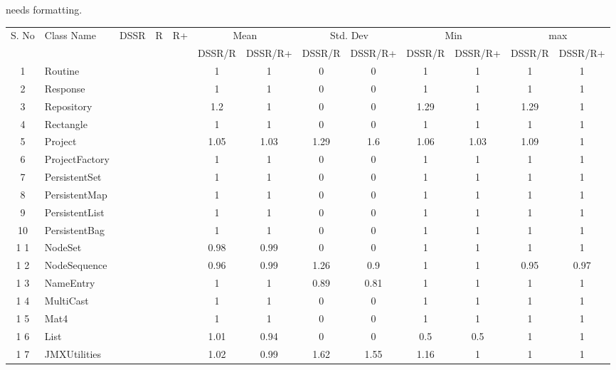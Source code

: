 \documentclass[conference]{IEEEtran}
\begin{document}
\newpage
needs formatting.
\newpage
 \scriptsize
    \begin{tabular}{|c|l|c|c|c|c|c|c|c|c|c|c|c|}
      \hline
      \multirow{2}{*}{S. No}	&\multirow{2}{*}{Class Name}	&\multirow{2}{*}{DSSR}	&	\multirow{2}{*}{R}	&	\multirow{2}{*}{R+}	& \multicolumn{2}{|c|}{Mean}	&\multicolumn{2}{|c|}{Std. Dev} & \multicolumn{2}{|c|}{Min} & \multicolumn{2}{|c|}{max}\\
      \cline{6-13}
             	& 			&&&		& DSSR/R		& DSSR/R+		& DSSR/R		& DSSR/R+		& DSSR/R		& DSSR/R+		& DSSR/R	 &	DSSR/R+	\\
	 \hline
      
      1		& Routine				&&&& 1		& 1		&  0		& 0		& 1		& 1		& 1		& 1	\\
      2		& Response			&&&& 1		& 1		&  0		& 0		& 1		& 1		& 1		& 1	\\
      3		& Repository			&&&& 1.2	& 1		&  0		& 0		& 1.29	& 1		& 1.29	& 1	\\
      4		& Rectangle			&&&& 1		& 1		&  0		& 0		& 1		& 1		& 1		& 1	\\
      5		& Project				&&&& 1.05	& 1.03	&  1.29	& 1.6	& 1.06	& 1.03	& 1.09	& 1	\\
      6		& ProjectFactory		&&&& 1		& 1		& 0		& 0		& 1		& 1		& 1		& 1	\\
      7		& PersistentSet			&&&& 1		& 1		& 0		& 0		& 1		& 1		& 1		& 1	\\
      8		& PersistentMap	&&&	& 1		& 1		& 0		& 0		& 1		& 1		& 1		& 1	\\
      9		& PersistentList		&&&	& 1		& 1		& 0		& 0		& 1		& 1		& 1		& 1	\\
      10	& PersistentBag	&&&	& 1		& 1		& 0		& 0		& 1		& 1		& 1		& 1	\\
      1	1	& NodeSet	 	&&&	& 0.98	& 0.99	& 0		& 0		& 1		& 1		& 1		& 1	\\ 
      1	2	& NodeSequence	&&&	& 0.96	& 0.99	& 1.26	& 0.9	& 1		& 1		& 0.95	& 0.97	\\
      1	3	& NameEntry 		&&&	& 1		& 1		& 0.89	& 0.81	& 1		& 1		& 1		& 1	\\
      1	4	& MultiCast		&&&	& 1		& 1		& 0		& 0		& 1		& 1		& 1		& 1	\\
      1	5	& Mat4			&&&	& 1		& 1		& 0		& 0		& 1		& 1		& 1		& 1	\\
      1	6	& List			&&&	& 1.01	& 0.94	& 0		& 0		& 0.5	&  0.5	& 1		& 1	\\
      1	7	& JMXUtilities		&&&	& 1.02	& 0.99	& 1.62	& 1.55	& 1.16	& 1		& 1		& 1	\\

\end{tabular}
\end{document}
